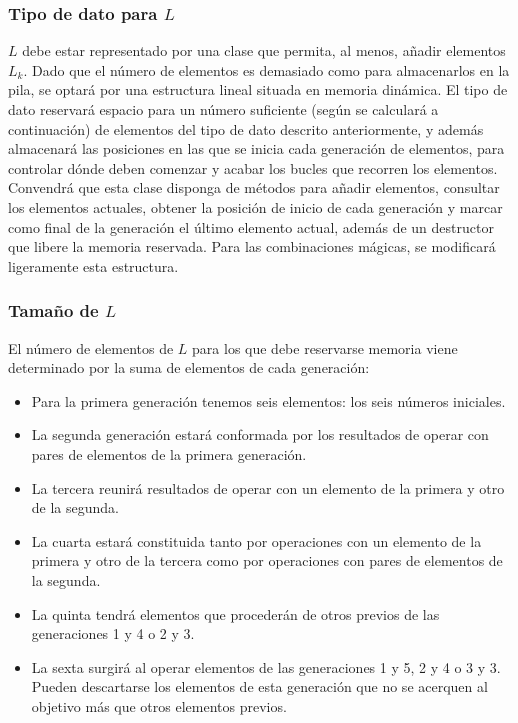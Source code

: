 \subsubsection{Tipo de dato para $L$}
$L$ debe estar representado por una clase que permita, al menos, añadir elementos $L_k$. Dado que el número de elementos es demasiado como para almacenarlos en la pila, se optará por una estructura lineal situada en memoria dinámica. El tipo de dato reservará espacio para un número suficiente (según se calculará a continuación) de elementos del tipo de dato descrito anteriormente, y además almacenará las posiciones en las que se inicia cada generación de elementos, para controlar dónde deben comenzar y acabar los bucles que recorren los elementos. \\

Convendrá que esta clase disponga de métodos para añadir elementos, consultar los elementos actuales, obtener la posición de inicio de cada generación y marcar como final de la generación el último elemento actual, además de un destructor que libere la memoria reservada. Para las combinaciones mágicas, se modificará ligeramente esta estructura. \\

\subsubsection{Tamaño de $L$}

El número de elementos de $L$ para los que debe reservarse memoria viene determinado por la suma de elementos de cada generación:
\begin{itemize}
	\item Para la primera generación tenemos seis elementos: los seis números iniciales.
	\item La segunda generación estará conformada por los resultados de operar con pares de elementos de la primera generación.
	\item La tercera reunirá resultados de operar con un elemento de la primera y otro de la segunda.
	\item La cuarta estará constituida tanto por operaciones con un elemento de la primera y otro de la tercera como por operaciones con pares de elementos de la segunda.
	\item La quinta tendrá elementos que procederán de otros previos de las generaciones 1 y 4 o 2 y 3.
	\item La sexta surgirá al operar elementos de las generaciones 1 y 5, 2 y 4 o 3 y 3. Pueden descartarse los elementos de esta generación que no se acerquen al objetivo más que otros elementos previos.
\end{itemize}

